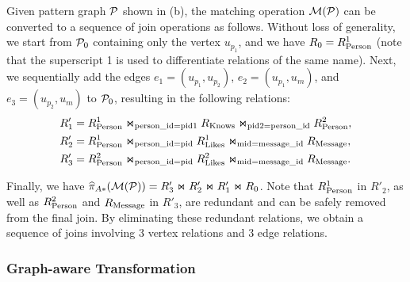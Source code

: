\begin{example}
  \label{ex:spjm-to-spj}
  Given pattern graph $\mathcal{P}$ shown in (b), the matching operation $\mathcal{M}(\mathcal{P})$ can be converted to a sequence of join operations as follows. Without loss of generality, we start from $\mathcal{P}_0$ containing only the vertex $u_{p_1}$, and we have ${R_{0}} = {R^{1}_{\text{Person}}}$ (note that the superscript 1 is used to differentiate relations of the same name).
  Next, we sequentially add the edges $e_1 = (u_{p_1}, u_{p_2})$, $e_2 = (u_{p_1}, u_{m})$, and $e_3 = (u_{p_2}, u_m)$ to $\mathcal{P}_0$, resulting in the following relations:
  \begin{equation*}
    \begin{split}
    R'_1 &= {R^{1}_{\text{Person}}} \Join_{\text{person\_id}=\text{pid1}} {R_{\text{Knows}}} \Join_{\text{pid2}=\text{person\_id}} {R^{2}_{\text{Person}}}, \\
    R'_2 &= {R^{1}_{\text{Person}}} \Join_{\text{person\_id}=\text{pid}} {R^{1}_{\text{Likes}}} \Join_{\text{mid}=\text{message\_id}} {R_{\text{Message}}}, \\
    R'_3 &= {R^{2}_{\text{Person}}} \Join_{\text{person\_id}=\text{pid}} {R^{2}_{\text{Likes}}} \Join_{\text{mid}=\text{message\_id}} {R_{\text{Message}}}.
    \end{split}
    \end{equation*}

    Finally, we have $\widehat{\pi}_{A*}(\mathcal{M}(\mathcal{P})) = R'_3 \Join R'_2 \Join R'_1 \Join {\ensuremath R_{0}}$.
    Note that ${R^{1}_{\text{Person}}}$ in $R'_2$, as well as ${R^{2}_{\text{Person}}}$ and ${R_{\text{Message}}}$ in $R'_3$, are redundant and can be safely removed from the final join. By eliminating these redundant relations, we obtain a sequence of joins involving 3 vertex relations and 3 edge relations.
\end{example}

\enlargethispage{1em}

\subsubsection{Graph-aware Transformation}
\label{sec:graph-aware}

